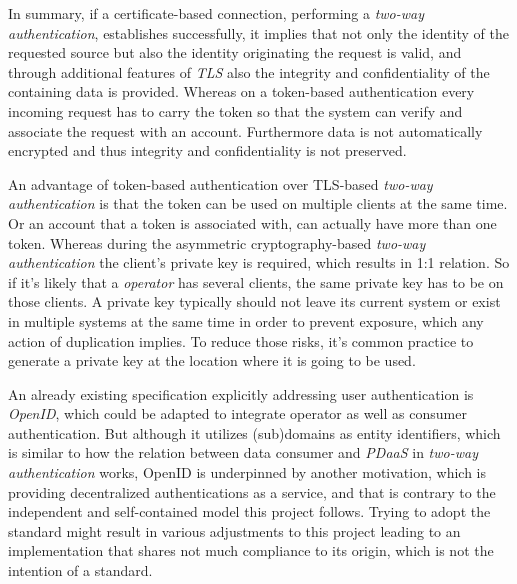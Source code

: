 \documentclass[12pt,english,a4paper,titlepage,cleardoublepage=empty,dottedtoc]{report}
\begin{document}
In summary, if a certificate-based connection, performing a
\emph{two-way authentication}, establishes successfully, it implies that
not only the identity of the requested source but also the identity
originating the request is valid, and through additional features of
\emph{TLS} also the integrity and confidentiality of the containing data
is provided. Whereas on a token-based authentication every incoming
request has to carry the token so that the system can verify and
associate the request with an account. Furthermore data is not
automatically encrypted and thus integrity and confidentiality is not
preserved.

An advantage of token-based authentication over TLS-based \emph{two-way
authentication} is that the token can be used on multiple clients at the
same time. Or an account that a token is associated with, can actually
have more than one token. Whereas during the asymmetric
cryptography-based \emph{two-way authentication} the client's private
key is required, which results in 1:1 relation. So if it's likely that a
\emph{operator} has several clients, the same private key has to be on
those clients. A private key typically should not leave its current
system or exist in multiple systems at the same time in order to prevent
exposure, which any action of duplication implies. To reduce those
risks, it's common practice to generate a private key at the location
where it is going to be used.

An already existing specification explicitly addressing user
authentication is \emph{OpenID}, which could be adapted to integrate
operator as well as consumer authentication. But although it utilizes
(sub)domains as entity identifiers, which is similar to how the relation
between data consumer and \emph{PDaaS} in \emph{two-way authentication}
works, OpenID is underpinned by another motivation, which is providing
decentralized authentications as a service, and that is contrary to the
independent and self-contained model this project follows. Trying to
adopt the standard might result in various adjustments to this project
leading to an implementation that shares not much compliance to its
origin, which is not the intention of a standard.
\end{document}
